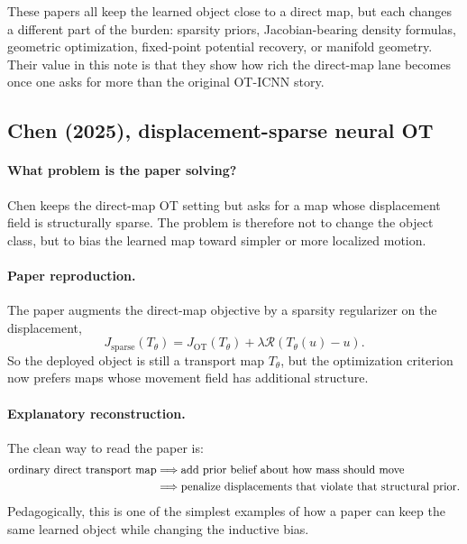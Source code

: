 \documentclass[11pt]{report}
\begin{document}
These papers all keep the learned object close to a direct map, but each changes a
different part of the burden: sparsity priors, Jacobian-bearing density formulas,
geometric optimization, fixed-point potential recovery, or manifold geometry.
Their value in this note is that they show how rich the direct-map lane becomes
once one asks for more than the original OT-ICNN story.

\subsection*{Chen (2025), displacement-sparse neural OT}

\paragraph{What problem is the paper solving?}
Chen keeps the direct-map OT setting but asks for a map whose displacement field is
structurally sparse.  The problem is therefore not to change the object class, but
to bias the learned map toward simpler or more localized motion.

\paragraph{Paper reproduction.}
The paper augments the direct-map objective by a sparsity regularizer on the
displacement,
\begin{equation}
J_{\mathrm{sparse}}(T_\theta)
=
J_{\mathrm{OT}}(T_\theta) + \lambda \mathcal R(T_\theta(u)-u).
\label{eq:chen-sparse-objective}
\end{equation}
So the deployed object is still a transport map $T_\theta$, but the optimization
criterion now prefers maps whose movement field has additional structure.

\paragraph{Explanatory reconstruction.}
The clean way to read the paper is:
\begin{align}
\text{ordinary direct transport map}
&\Longrightarrow
\text{add prior belief about how mass should move}
\notag\\
&\Longrightarrow
\text{penalize displacements that violate that structural prior}.
\label{eq:chen-logic}
\end{align}
Pedagogically, this is one of the simplest examples of how a paper can keep the
same learned object while changing the inductive bias.
\end{document}
